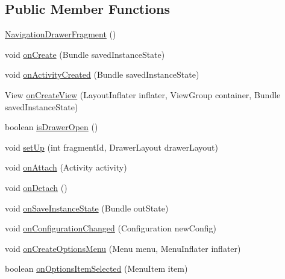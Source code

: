 \subsection*{Public Member Functions}
\begin{DoxyCompactItemize}
\item 
\hyperlink{classorg_1_1buildmlearn_1_1toolkit_1_1fragment_1_1NavigationDrawerFragment_a5f3f1b07fbb49a4d21f98008e702e8d4}{Navigation\-Drawer\-Fragment} ()
\item 
void \hyperlink{classorg_1_1buildmlearn_1_1toolkit_1_1fragment_1_1NavigationDrawerFragment_a7a9c297215fb754ea5bd3745233cec21}{on\-Create} (Bundle saved\-Instance\-State)
\item 
void \hyperlink{classorg_1_1buildmlearn_1_1toolkit_1_1fragment_1_1NavigationDrawerFragment_a734263415ae5341ea1cb5b4b2a469581}{on\-Activity\-Created} (Bundle saved\-Instance\-State)
\item 
View \hyperlink{classorg_1_1buildmlearn_1_1toolkit_1_1fragment_1_1NavigationDrawerFragment_a960b71d9ccecc621b4a5506f38a105cf}{on\-Create\-View} (Layout\-Inflater inflater, View\-Group container, Bundle saved\-Instance\-State)
\item 
boolean \hyperlink{classorg_1_1buildmlearn_1_1toolkit_1_1fragment_1_1NavigationDrawerFragment_a85975c4bf9994479fb882843b31988b5}{is\-Drawer\-Open} ()
\item 
void \hyperlink{classorg_1_1buildmlearn_1_1toolkit_1_1fragment_1_1NavigationDrawerFragment_a6ec051ce4329da7861cc19a0e01ed01b}{set\-Up} (int fragment\-Id, Drawer\-Layout drawer\-Layout)
\item 
void \hyperlink{classorg_1_1buildmlearn_1_1toolkit_1_1fragment_1_1NavigationDrawerFragment_ab5f8207c0919a7add76e3de6ea407ae0}{on\-Attach} (Activity activity)
\item 
void \hyperlink{classorg_1_1buildmlearn_1_1toolkit_1_1fragment_1_1NavigationDrawerFragment_af5ec3253d086d2733aea3a595061c389}{on\-Detach} ()
\item 
void \hyperlink{classorg_1_1buildmlearn_1_1toolkit_1_1fragment_1_1NavigationDrawerFragment_a3ecc348d09897125baff9673c4145a55}{on\-Save\-Instance\-State} (Bundle out\-State)
\item 
void \hyperlink{classorg_1_1buildmlearn_1_1toolkit_1_1fragment_1_1NavigationDrawerFragment_aa216d0cfc2c54c3cd6c9f91cb005cea1}{on\-Configuration\-Changed} (Configuration new\-Config)
\item 
void \hyperlink{classorg_1_1buildmlearn_1_1toolkit_1_1fragment_1_1NavigationDrawerFragment_a23412cd6598c10cee64ff60848cc6771}{on\-Create\-Options\-Menu} (Menu menu, Menu\-Inflater inflater)
\item 
boolean \hyperlink{classorg_1_1buildmlearn_1_1toolkit_1_1fragment_1_1NavigationDrawerFragment_a68eb844e52918f108a9145c9fd9e1bee}{on\-Options\-Item\-Selected} (Menu\-Item item)
\end{DoxyCompactItemize}
